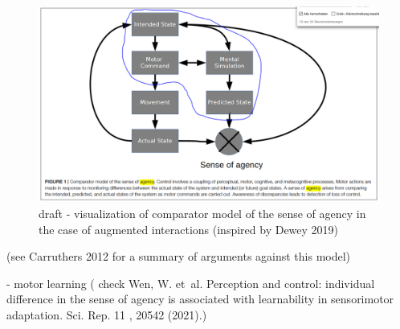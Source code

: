 \begin{figure}
    \centering
    \includegraphics[width=\columnwidth]{figures/augmented_com_model_draft.png}
    \caption{draft - visualization of comparator model of the sense of agency in the case of augmented interactions (inspired by Dewey 2019)}
    \label{fig:com_model}
\end{figure}
(see Carruthers 2012 for a summary of arguments against this model)

- motor learning ( check Wen, W. et al. Perception and control: individual difference in the sense of agency is associated with learnability in sensorimotor adaptation. Sci. Rep. 11 , 20542 (2021).)




